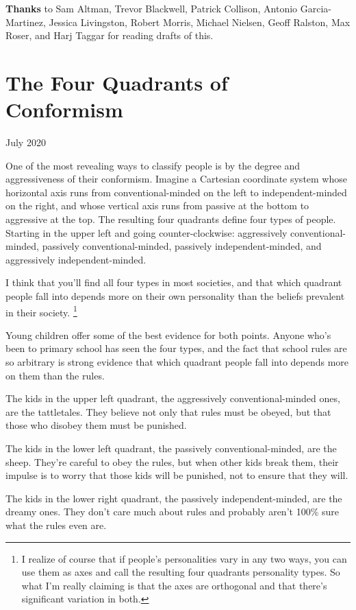 \documentclass[12pt]{book}
\begin{document}
\textbf{Thanks} to Sam Altman, Trevor Blackwell, Patrick Collison,
Antonio Garcia-Martinez, Jessica Livingston, Robert Morris, Michael
Nielsen, Geoff Ralston, Max Roser, and Harj Taggar for reading drafts of
this.
\chapter{The Four Quadrants of Conformism}

July 2020

One of the most revealing ways to classify people is by the degree and
aggressiveness of their conformism. Imagine a Cartesian coordinate
system whose horizontal axis runs from conventional-minded on the left
to independent-minded on the right, and whose vertical axis runs from
passive at the bottom to aggressive at the top. The resulting four
quadrants define four types of people. Starting in the upper left and
going counter-clockwise: aggressively conventional-minded, passively
conventional-minded, passively independent-minded, and aggressively
independent-minded.

I think that you'll find all four types in most societies, and that
which quadrant people fall into depends more on their own personality
than the beliefs prevalent in their society. \footnote{I realize of course that if people's personalities vary in any
two ways, you can use them as axes and call the resulting four quadrants
personality types. So what I'm really claiming is that the axes are
orthogonal and that there's significant variation in both.}

Young children offer some of the best evidence for both points. Anyone
who's been to primary school has seen the four types, and the fact that
school rules are so arbitrary is strong evidence that which quadrant
people fall into depends more on them than the rules.

The kids in the upper left quadrant, the aggressively
conventional-minded ones, are the tattletales. They believe not only
that rules must be obeyed, but that those who disobey them must be
punished.

The kids in the lower left quadrant, the passively conventional-minded,
are the sheep. They're careful to obey the rules, but when other kids
break them, their impulse is to worry that those kids will be punished,
not to ensure that they will.

The kids in the lower right quadrant, the passively independent-minded,
are the dreamy ones. They don't care much about rules and probably
aren't 100\% sure what the rules even are.
\end{document}
